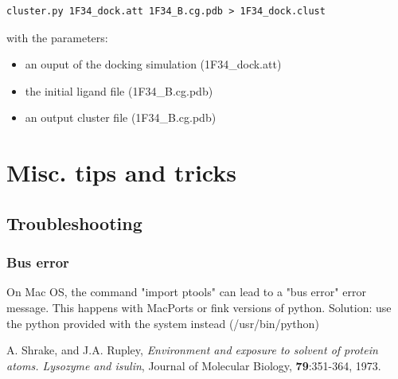 \documentclass[12pt,a4paper]{article}
\begin{document}
\begin{verbatim}
cluster.py 1F34_dock.att 1F34_B.cg.pdb > 1F34_dock.clust
\end{verbatim}

with the parameters:
\begin{itemize}
\item an ouput of the docking simulation (1F34\_dock.att)
\item the initial ligand file (1F34\_B.cg.pdb)
\item an output cluster file (1F34\_B.cg.pdb)
\end{itemize}


\section{Misc. tips and tricks}


\subsection{Troubleshooting}

\subsubsection{Bus error}
On Mac OS, the command "import ptools" can lead to a "bus error" error message. This happens with MacPorts or 
fink versions of python. Solution: use the python provided with the system instead (/usr/bin/python)



\begin{thebibliography}{99}

 A. Shrake, and J.A. Rupley, 
{\it Environment and exposure to solvent of protein atoms. Lysozyme and
isulin}, 
Journal of Molecular Biology, {\bf 79}:351-364, 1973.

\end{thebibliography}
\end{document}
